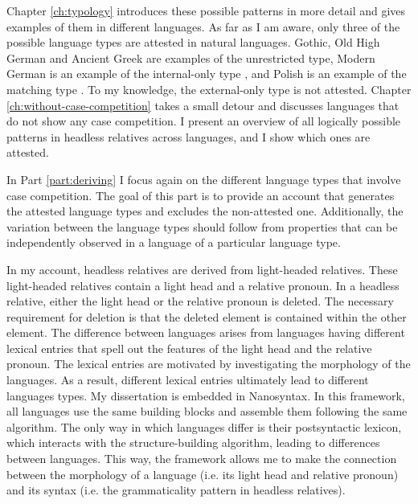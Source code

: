 Chapter \ref{ch:typology} introduces these possible patterns in more detail and gives examples of them in different languages. As far as I am aware, only three of the possible language types are attested in natural languages. Gothic, Old High German and Ancient Greek are examples of the unrestricted type, Modern German is an example of the internal-only type \citep{vogel2001}, and Polish is an example of the matching type \citep{citko2013}. To my knowledge, the external-only type is not attested.
Chapter \ref{ch:without-case-competition} takes a small detour and discusses languages that do not show any case competition. I present an overview of all logically possible patterns in headless relatives across languages, and I show which ones are attested.

In Part \ref{part:deriving} I focus again on the different language types that involve case competition. The goal of this part is to provide an account that generates the attested language types and excludes the non-attested one. Additionally, the variation between the language types should follow from properties that can be independently observed in a language of a particular language type.

In my account, headless relatives are derived from light-headed relatives. These light-headed relatives contain a light head and a relative pronoun. In a headless relative, either the light head or the relative pronoun is deleted. The necessary requirement for deletion is that the deleted element is contained within the other element.
The difference between languages arises from languages having different lexical entries that spell out the features of the light head and the relative pronoun.
The lexical entries are motivated by investigating the morphology of the languages. As a result, different lexical entries ultimately lead to different languages types.
My dissertation is embedded in Nanosyntax. In this framework, all languages use the same building blocks and assemble them following the same algorithm. The only way in which languages differ is their postsyntactic lexicon, which interacts with the structure-building algorithm, leading to differences between languages. This way, the framework allows me to make the connection between the morphology of a language (i.e. its light head and relative pronoun) and its syntax (i.e. the grammaticality pattern in headless relatives).

